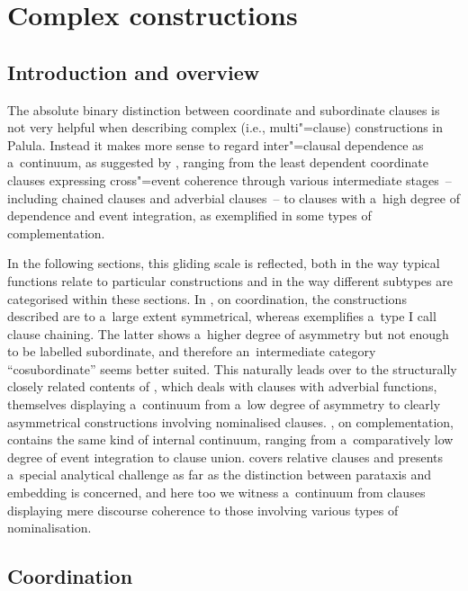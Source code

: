 \chapter{Complex constructions}
\label{chap:13}

\section{Introduction and overview}
\label{sec:13-1}


The absolute binary distinction between coordinate and subordinate clauses is not very helpful when describing complex (i.e., multi"=clause) constructions in Palula. Instead it makes more sense to regard inter"=clausal dependence as a~continuum, as suggested by \citet[327--328]{givon2001b}, ranging from the least dependent coordinate clauses expressing cross"=event coherence through various intermediate stages~-- including chained clauses and adverbial clauses~-- to clauses with a~high degree of dependence and event integration, as exemplified in some types of complementation.



In the following sections, this gliding scale is reflected, both in the way typical functions relate to particular constructions and in the way different subtypes are categorised within these sections. In , on coordination, the constructions described are to a~large extent symmetrical, whereas  exemplifies a~type I call clause chaining. The latter shows a~higher degree of asymmetry but not enough to be labelled subordinate, and therefore an~intermediate category ``cosubordinate'' seems better suited. This naturally leads over to the structurally closely related contents of , which deals with clauses with adverbial functions, themselves displaying a~continuum from a~low degree of asymmetry to clearly asymmetrical constructions involving nominalised clauses. , on complementation, contains the same kind of internal continuum, ranging from a~comparatively low degree of event integration to clause union.  covers relative clauses and presents a~special analytical challenge as far as the distinction between parataxis and embedding is concerned, and here too we witness a~continuum from clauses displaying mere discourse coherence to those involving various types of nominalisation.


\section{Coordination}
\label{sec:13-2}

